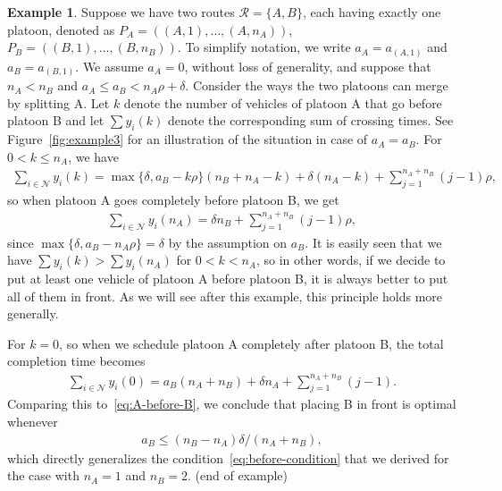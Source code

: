 \documentclass{report}
\theoremstyle{definition}
\newtheorem{eg}{Example}[chapter]
\theoremstyle{plain}
\begin{document}
\begin{eg}
  \label{example3}
  Suppose we have two routes $\mathcal{R} = \{ A, B \}$, each having exactly one
  platoon, denoted as $P_{A} = ((A,1), \dots, (A,n_{A}))$,
  $P_{B} = ((B,1), \dots, (B,n_{B}))$. To simplify notation, we write
  $a_{A} = a_{(A,1)}$ and $a_{B} = a_{(B,1)}$. We assume $a_{A} = 0$, without
  loss of generality, and suppose that $n_{A} < n_{B}$ and
  $a_{A} \leq a_{B} < n_{A}\rho + \delta$. Consider the ways the two platoons
  can merge by splitting A. Let $k$ denote the number of vehicles of platoon A
  that go before platoon B and let $\sum y_{i}(k)$ denote the corresponding
  sum of crossing times. See Figure~\ref{fig:example3} for an illustration of the
  situation in case of $a_{A} = a_{B}$. For $0 < k \leq n_{A}$, we have
  \begin{align*}
    \sum_{i \in \mathcal{N}} y_{i} (k) = \max\{ \delta, a_{B} - k\rho\} (n_{B} + n_{A} - k) + \delta (n_{A} - k) + \sum_{j=1}^{n_{A}+n_{B}} (j-1) \rho ,
  \end{align*}
  so when platoon A goes completely before platoon B, we get
  \begin{align}
    \sum_{i \in \mathcal{N}} y_{i} (n_{A}) = \delta n_{B} + \sum_{j=1}^{n_{A}+n_{B}} (j-1) \rho ,
    \label{eq:A-before-B}
  \end{align}
  since $\max\{ \delta, a_{B} - n_{A} \rho \} = \delta$ by the assumption on $a_{B}$. It is
  easily seen that we have $\sum y_{i}(k) > \sum y_{i} (n_{A})$ for $0 < k < n_{A}$,
  so in other words, if we decide to put at least one vehicle of platoon A
  before platoon B, it is always better to put all of them in front. As we will
  see after this example, this principle holds more generally.

  For $k=0$, so when we schedule platoon A completely after platoon B, the total
  completion time becomes
  \begin{align*}
    \sum_{i \in \mathcal{N}} y_{i} (0) = a_{B} (n_{A} + n_{B}) + \delta n_{A} + \sum_{j=1}^{n_{A}+n_{B}} (j-1) .
  \end{align*}
  Comparing this to~\eqref{eq:A-before-B}, we conclude that placing B in front
  is optimal whenever
  \begin{align*}
    a_{B} \leq (n_{B} - n_{A}) \delta / (n_{A} + n_{B}) ,
  \end{align*}
  which directly generalizes the condition~\eqref{eq:before-condition} that we
  derived for the case with $n_{A} = 1$ and $n_{B} = 2$. (end of example)
\end{eg}
\end{document}
